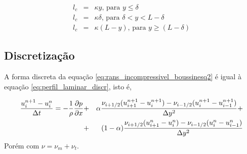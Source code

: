 \begin{subequations}
  \begin{eqnarray}
    l_c &=& \kappa y\text{, para }y\leq\delta\\
    l_c &=& \kappa \delta\text{, para }\delta<y<L-\delta\\
    l_c &=& \kappa(L-y)\text{, para }y\geq(L-\delta)
  \end{eqnarray}
\end{subequations}

\subsection{Discretização}

A forma discreta da equação \ref{eq:rans_incompressivel_boussinesq2} é igual à equação \ref{eq:perfil_laminar_discr}, isto é,

\begin{eqnarray}
  \frac{u_i^{n+1}-u_i^n}{\Delta t} = -\frac{1}{\rho}\frac{\partial p}{\partial x} &+& \alpha\frac{\nu_{i+1/2}(u_{i+1}^{n+1}-u_{i}^{n+1})-\nu_{i-1/2}(u_{i}^{n+1}-u_{i-1}^{n+1})}{\Delta y^2}+\nonumber\\ &+& (1-\alpha)\frac{\nu_{i+1/2}(u_{i+1}^n-u_{i}^n)-\nu_{i-1/2}(u_{i}^n-u_{i-1}^n)}{\Delta y^2}
  \label{eq:perfil_turbulento_discr}
\end{eqnarray}
Porém com $\nu = \nu_m+\nu_t$.

